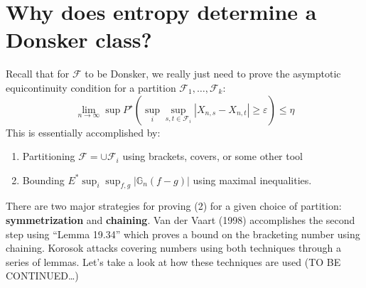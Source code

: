 \documentclass[
]{article}
\begin{document}
\section{Why does entropy determine a Donsker class?} 
Recall that for \(\mathcal{F}\) to be
Donsker, we really just need to prove the asymptotic equicontinuity
condition for a partition \(\mathcal{F}_1,\ldots,\mathcal{F}_k\):
\[\lim_{n\rightarrow\infty}\sup P^\star(\sup_i\sup_{s,t \in \mathcal{F}_i} |X_{n,s} - X_{n,t}|\geq \varepsilon) \leq \eta\]
This is essentially accomplished by: 
\begin{enumerate}
	\item Partitioning
	\(\mathcal{F} = \cup \mathcal{F}_i\) using brackets, covers, or some
	other tool
	\item Bounding \(E^*\sup_i \sup_{f,g} |\mathbb{G}_n(f-g)|\)
	using maximal inequalities.
\end{enumerate}

There are two major strategies for proving (2) for a given choice of
partition: \textbf{symmetrization} and \textbf{chaining}. Van der Vaart
(1998) accomplishes the second step using ``Lemma 19.34'' which proves a
bound on the bracketing number using chaining. Korosok attacks covering
numbers using both techniques through a series of lemmas. Let's take a
look at how these techniques are used (TO BE CONTINUED\ldots)
\end{document}

